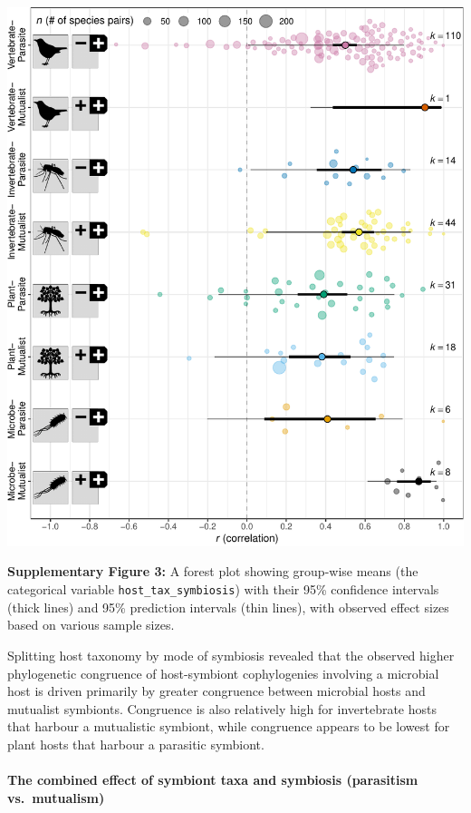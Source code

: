 \documentclass[
]{article}
\begin{document}
\includegraphics{Supporting_Information_files/figure-latex/unnamed-chunk-41-1.pdf}

\textbf{Supplementary Figure 3:} A forest plot showing group-wise means
(the categorical variable \texttt{host\_tax\_symbiosis}) with their 95\%
confidence intervals (thick lines) and 95\% prediction intervals (thin
lines), with observed effect sizes based on various sample sizes.

Splitting host taxonomy by mode of symbiosis revealed that the observed
higher phylogenetic congruence of host-symbiont cophylogenies involving
a microbial host is driven primarily by greater congruence between
microbial hosts and mutualist symbionts. Congruence is also relatively
high for invertebrate hosts that harbour a mutualistic symbiont, while
congruence appears to be lowest for plant hosts that harbour a parasitic
symbiont.

\hypertarget{the-combined-effect-of-symbiont-taxa-and-symbiosis-parasitism-vs.-mutualism}{%
\paragraph{The combined effect of symbiont taxa and symbiosis
(parasitism
vs.~mutualism)}\label{the-combined-effect-of-symbiont-taxa-and-symbiosis-parasitism-vs.-mutualism}}
\end{document}
